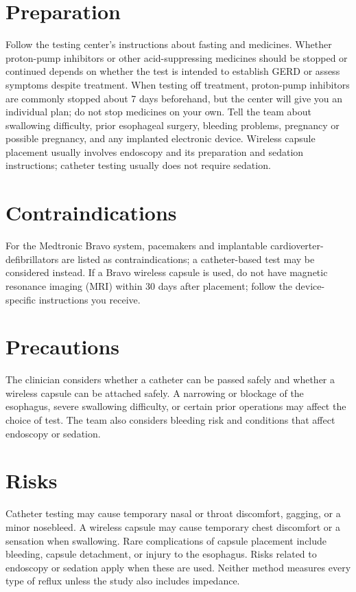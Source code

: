 \section*{Preparation}
Follow the testing center's instructions about fasting and medicines. Whether proton-pump inhibitors or other acid-suppressing medicines should be stopped or continued depends on whether the test is intended to establish GERD or assess symptoms despite treatment. When testing off treatment, proton-pump inhibitors are commonly stopped about 7 days beforehand, but the center will give you an individual plan; do not stop medicines on your own. Tell the team about swallowing difficulty, prior esophageal surgery, bleeding problems, pregnancy or possible pregnancy, and any implanted electronic device. Wireless capsule placement usually involves endoscopy and its preparation and sedation instructions; catheter testing usually does not require sedation.

\section*{Contraindications}
For the Medtronic Bravo system, pacemakers and implantable cardioverter-defibrillators are listed as contraindications; a catheter-based test may be considered instead. If a Bravo wireless capsule is used, do not have magnetic resonance imaging (MRI) within 30 days after placement; follow the device-specific instructions you receive.

\section*{Precautions}
The clinician considers whether a catheter can be passed safely and whether a wireless capsule can be attached safely. A narrowing or blockage of the esophagus, severe swallowing difficulty, or certain prior operations may affect the choice of test. The team also considers bleeding risk and conditions that affect endoscopy or sedation.

\section*{Risks}
Catheter testing may cause temporary nasal or throat discomfort, gagging, or a minor nosebleed. A wireless capsule may cause temporary chest discomfort or a sensation when swallowing. Rare complications of capsule placement include bleeding, capsule detachment, or injury to the esophagus. Risks related to endoscopy or sedation apply when these are used. Neither method measures every type of reflux unless the study also includes impedance.

